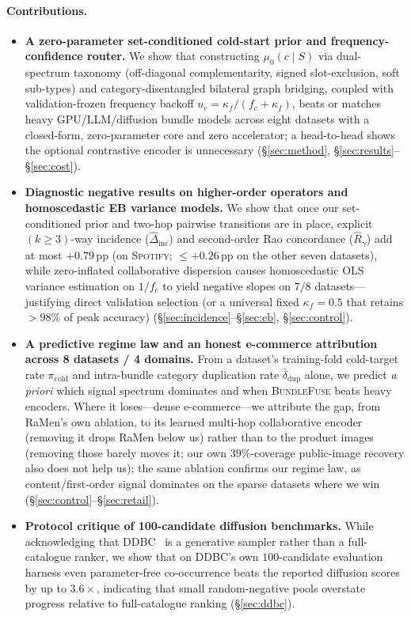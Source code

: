 \paragraph{Contributions.}
\begin{itemize}\itemsep1pt
  \item \textbf{A zero-parameter set-conditioned cold-start prior and frequency-confidence router.}
  We show that constructing $\mu_0(c\mid S)$ via dual-spectrum taxonomy (off-diagonal complementarity, signed
  slot-exclusion, soft sub-types) and category-disentangled bilateral graph bridging, coupled with validation-frozen
  frequency backoff $u_c = \kappa_f / (f_c + \kappa_f)$, beats or matches heavy GPU/LLM/diffusion bundle models
  across eight datasets with a closed-form, zero-parameter core and zero accelerator; a head-to-head shows the
  optional contrastive encoder is unnecessary (\S\ref{sec:method}, \S\ref{sec:results}--\S\ref{sec:cost}).
  \item \textbf{Diagnostic negative results on higher-order operators and homoscedastic EB variance models.}
  We show that once our set-conditioned prior and two-hop pairwise transitions are in place, explicit $(k\ge 3)$-way
  incidence ($\hat{\Delta}_{\text{inc}}$) and second-order Rao concordance ($\hat{R}_{\gamma}$) add at most
  $+0.79$\,pp (on \textsc{Spotify}; ${\le}+0.26$\,pp on the other seven datasets), while zero-inflated collaborative
  dispersion causes homoscedastic OLS variance estimation on $1/f_c$
  to yield negative slopes on $7/8$ datasets---justifying direct validation selection (or a universal fixed
  $\kappa_f = 0.5$ that retains $>98\%$ of peak accuracy) (\S\ref{sec:incidence}--\S\ref{sec:eb}, \S\ref{sec:control}).
  \item \textbf{A predictive regime law and an honest e-commerce attribution across 8 datasets / 4 domains.} From a
  dataset's training-fold cold-target rate $\pi_{\text{cold}}$ and intra-bundle category duplication rate
  $\bar{\delta}_{\text{dup}}$ alone, we predict \emph{a priori} which signal spectrum dominates and when
  \textsc{BundleFuse} beats heavy encoders. Where it loses---dense e-commerce---we attribute the gap, from RaMen's
  own ablation, to its learned multi-hop collaborative encoder (removing it drops RaMen below us) rather than to the
  product images (removing those barely moves it; our own $39\%$-coverage public-image recovery also does not help
  us); the same ablation confirms our regime law, as content/first-order signal dominates on the sparse datasets
  where we win (\S\ref{sec:control}--\S\ref{sec:retail}).
  \item \textbf{Protocol critique of 100-candidate diffusion benchmarks.} While acknowledging
  that DDBC~\cite{ddbc} is a generative sampler rather than a full-catalogue ranker, we show that on DDBC's own
  $100$-candidate evaluation harness even parameter-free co-occurrence beats the reported diffusion scores by up to
  $3.6\times$, indicating that small random-negative pools overstate progress relative to full-catalogue ranking
  (\S\ref{sec:ddbc}).
\end{itemize}
